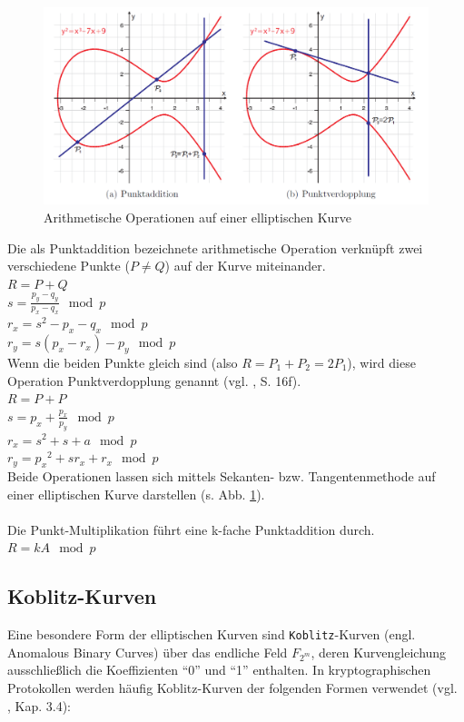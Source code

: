 \begin{figure}[H]
	\centering
	\includegraphics[width=\textwidth]{bilder/p-addition}
	\caption{Arithmetische Operationen auf einer elliptischen Kurve}
	\label{fig:padd}
\end{figure}

Die als Punktaddition bezeichnete arithmetische Operation verknüpft zwei verschiedene Punkte ($P \ne Q$) auf der Kurve miteinander. \\

$R = P + Q$ \\
$s = \frac{p_y-q_y}{p_x-q_x} \mod p$ \\
$r_x = s^2 - p_x - q_x \mod p$ \\
$r_y = s(p_x-r_x)-p_y \mod p$ \\

Wenn die beiden Punkte gleich sind (also $R = P_1 + P_2 = 2 P_1$), wird diese Operation Punktverdopplung genannt (vgl. \cite{puttmann}, S. 16f). \\

$R=P+P$ \\
$s=p_x + \frac{p_x}{p_y} \mod p$ \\  
$r_x=s^2 + s + a \mod p$ \\  
$r_y={p_x}^2 + s{r_x} + r_x \mod p$ \\

Beide Operationen lassen sich mittels Sekanten- bzw. Tangentenmethode auf einer elliptischen Kurve darstellen (s. Abb. \ref{fig:padd}). 
\\ \\
Die Punkt-Multiplikation führt eine k-fache Punktaddition durch. \\

$R = k A \mod p$

\subsection{Koblitz-Kurven}
Eine besondere Form der elliptischen Kurven sind \texttt{Koblitz}-Kurven (engl. Anomalous Binary Curves) über das endliche Feld $F_{2^m}$, deren Kurvengleichung ausschließlich die Koeffizienten ``0'' und ``1'' enthalten. In kryptographischen Protokollen werden häufig Koblitz-Kurven der folgenden Formen verwendet (vgl. \cite{guide}, Kap. 3.4):

